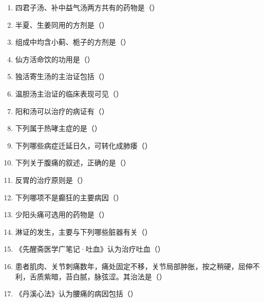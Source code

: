 \documentclass[a4paper,11pt]{ctexart}
\begin{document}
\begin{enumerate}[resume]
      \item 四君子汤、补中益气汤两方共有的药物是（\quad）
      \item 半夏、生姜同用的方剂是（\quad）
      \item 组成中均含小蓟、栀子的方剂是（\quad）
      \item 仙方活命饮的功用是（\quad）
      \item 独活寄生汤的主治证包括（\quad）
      \item 温胆汤主治证的临床表现可见（\quad）
      \item 阳和汤可以治疗的病证有（\quad）
      \item 下列属于热哮主症的是（\quad）
      \item 下列哪些病症迁延日久，可转化成肺痿（\quad）
      \item 下列关于腹痛的叙述，正确的是（\quad）
      \item 反胃的治疗原则是（\quad）
      \item 下列哪项不是癫狂的主要病因（\quad）
      \item 少阳头痛可选用的药物是（\quad）
      \item 淋证的发生，主要与下列哪些脏器有关（\quad）
      \item 《先醒斋医学广笔记·吐血》认为治疗吐血（\quad）
      \item 患者肌肉、关节刺痛数年，痛处固定不移，关节局部肿胀，按之稍硬，屈伸不利，舌质紫暗，苔白腻，脉弦涩。其治法是（\quad）
      \item 《丹溪心法》认为腰痛的病因包括（\quad）

\end{enumerate}
\end{document}
